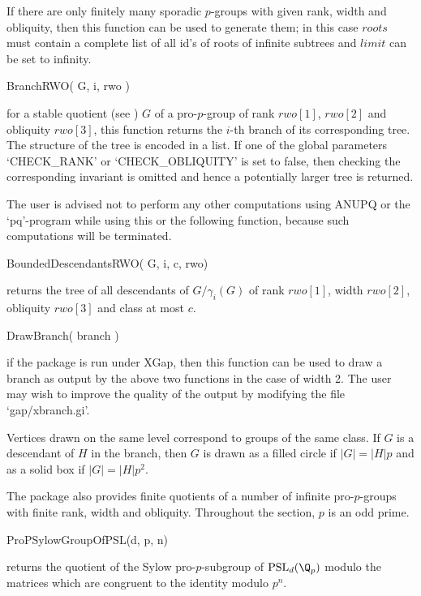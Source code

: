 If there are only finitely many sporadic $p$-groups with given rank,
width and obliquity, then this function can be used to generate them;
in this case $roots$ must contain a complete list of all id's of roots
of infinite subtrees and $limit$ can be set to infinity.

\> BranchRWO( G, i, rwo )

for a stable  quotient (see \cite{ER10}) $G$ of a pro-$p$-group of
rank $rwo[1]$, $rwo[2]$ and obliquity $rwo[3]$, this function returns
the $i$-th branch of its corresponding tree. The structure of the tree
is encoded in a list. If one of the global parameters `CHECK_RANK' or 
`CHECK_OBLIQUITY' is set to false, then checking the corresponding
invariant is omitted and hence a potentially larger tree is returned. 

The user is advised not to perform any other computations using ANUPQ
or the `pq'-program while using this or the following function,
because such computations will be terminated.

\> BoundedDescendantsRWO( G, i, c, rwo)

returns the tree of all descendants of $G/\gamma_i(G)$ of rank $rwo[1]$,
width $rwo[2]$, obliquity $rwo[3]$ and class at most $c$.

\> DrawBranch( branch )

if the package is run under XGap, then this function can be used to draw
a branch as output by the above two functions in the case of width 2.
The user may wish to improve the quality of the output by modifying
the file `gap/xbranch.gi'.

Vertices drawn on the same level correspond to groups of the same
class. If $G$ is a descendant of $H$ in the branch, then $G$ is drawn
as a filled circle if $\vert G\vert = \vert H\vert p$ and as a solid
box if $\vert G\vert = \vert H\vert p^2$.



The package also provides finite quotients of a number of infinite
pro-$p$-groups with finite rank, width and obliquity. Throughout the
section, $p$ is an odd prime.

\> ProPSylowGroupOfPSL(d, p, n)

returns the quotient of the Sylow pro-$p$-subgroup of
${\rm PSL}_d({\Q}_p)$ modulo the matrices which are congruent to the
identity modulo $p^n$. 
  
